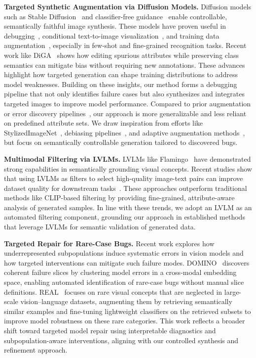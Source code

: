 \documentclass[10pt]{article} %
\begin{document}
\noindent\textbf{Targeted Synthetic Augmentation via Diffusion Models.}
Diffusion models such as Stable Diffusion~\citep{rombach2022high} and classifier-free guidance~\citep{ho2022classifierfree} enable controllable, semantically faithful image synthesis. These models have proven useful in debugging~\citep{casper2022robust, fang2024data, huang2024data}, conditional text-to-image visualization~\citep{augustin2022diffusion, boreiko2022sparse}, and training data augmentation~\citep{trabucco2023effective, dunlap2023diversify}, especially in few-shot and fine-grained recognition tasks. Recent work like DiGA~\citep{zhang2024distributionally} shows how editing spurious attributes while preserving class semantics can mitigate bias without requiring new annotations. These advances highlight how targeted generation can shape training distributions to address model weaknesses. Building on these insights, our method forms a debugging pipeline that not only identifies failure cases but also synthesizes and integrates targeted images to improve model performance. Compared to prior augmentation or error discovery pipelines~\citep{fang2024data, huang2024data, chen2023hibug}, our approach is more generalizable and less reliant on predefined attribute sets. We draw inspiration from efforts like StylizedImageNet~\citep{geirhos2019imagenet}, debiasing pipelines~\citep{jin2021background}, and adaptive augmentation methods~\citep{mikolajczyk2023targeted, zhao2022adaptive, wang2024domain}, but focus on semantically controllable generation tailored to discovered bugs. 

\noindent\textbf{Multimodal Filtering via LVLMs.} LVLMs like Flamingo~\citep{alayrac2022flamingo} have demonstrated strong capabilities in semantically grounding visual concepts. Recent studies show that using LVLMs as filters to select high-quality image-text pairs can improve dataset quality for downstream tasks~\citep{wang2024finetuned, li2024self}. These approaches outperform traditional methods like CLIP-based filtering by providing fine-grained, attribute-aware analysis of generated samples. In line with these trends, we adopt an LVLM as an automated filtering component, grounding our approach in established methods that leverage LVLMs for semantic validation of generated data. 

\noindent\textbf{Targeted Repair for Rare-Case Bugs.}  
Recent work explores how underrepresented subpopulations induce systematic errors in vision models and how targeted interventions can mitigate such failure modes. DOMINO~\citep{eyuboglu2022rare} discovers coherent failure slices by clustering model errors in a cross‑modal embedding space, enabling automated identification of rare-case bugs without manual slice definitions.
REAL~\citep{parashar2024neglected} focuses on rare visual concepts that are neglected in large-scale vision--language datasets, augmenting them by retrieving semantically similar examples and fine-tuning lightweight classifiers on the retrieved subsets to improve model robustness on these rare categories.
This work reflects a broader shift toward targeted model repair using interpretable diagnostics and subpopulation-aware interventions, aligning with our controlled synthesis and refinement approach.
\end{document}
